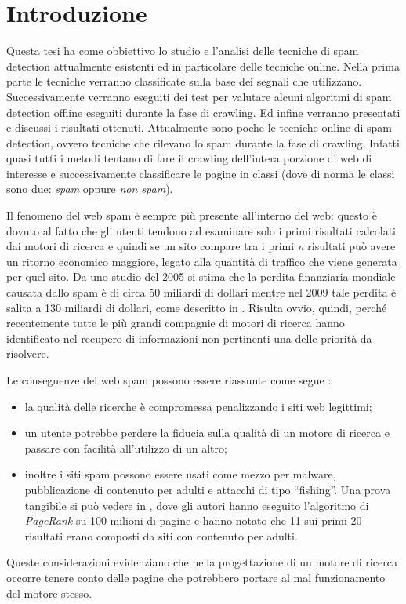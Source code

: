 \chapter{Introduzione}

Questa tesi ha come obbiettivo lo studio e l'analisi delle tecniche di spam detection attualmente esistenti ed in particolare delle tecniche online. Nella prima parte le tecniche verranno classificate sulla base dei segnali che utilizzano. Successivamente verranno eseguiti dei test per valutare alcuni algoritmi di spam detection offline eseguiti durante la fase di crawling. Ed infine verranno presentati e discussi i risultati ottenuti. Attualmente sono poche le tecniche online di spam detection, ovvero tecniche che rilevano lo spam durante la fase di crawling. Infatti quasi tutti i metodi tentano di fare il crawling dell'intera porzione di web di interesse e successivamente classificare le pagine in classi (dove di norma le classi sono due: \textit{spam} oppure \textit{non spam}).

Il fenomeno del web spam è sempre più presente all'interno del web: questo è dovuto al fatto che gli utenti tendono ad esaminare solo i primi risultati calcolati dai motori di ricerca e quindi se un sito compare tra i primi \textit{n} risultati può avere un ritorno economico maggiore, legato alla quantità di traffico che viene generata per quel sito. Da uno studio  del 2005 \cite{Nicholas:2005} si stima che la perdita finanziaria mondiale causata dallo spam è di circa 50 miliardi di dollari mentre nel 2009 tale perdita è salita a 130 miliardi di dollari, come descritto in \cite{Nicholas:2009}. Risulta ovvio, quindi, perché recentemente tutte le più grandi compagnie di motori di ricerca hanno identificato nel recupero di informazioni non pertinenti una delle priorità da risolvere. 

Le conseguenze del web spam possono essere riassunte come segue \cite{Spirin:2012:SWS:2207243.2207252}:
\begin{itemize}
 \item la qualità delle ricerche è compromessa penalizzando i siti web legittimi;
 \item un utente potrebbe perdere la fiducia sulla qualità di un motore di ricerca e passare con facilità all'utilizzo di un altro;
 \item inoltre i siti spam possono essere usati come mezzo per malware, pubblicazione di contenuto per adulti e attacchi di tipo ``fishing''. Una prova tangibile si può vedere in \cite{Eiron:2004:RWF:988672.988714}, dove gli autori hanno eseguito l'algoritmo di \textit{PageRank} su 100 milioni di pagine e hanno notato che 11 sui primi 20 risultati erano composti da siti con contenuto per adulti.
\end{itemize}
Queste considerazioni evidenziano che nella progettazione di un motore di ricerca occorre tenere conto delle pagine che potrebbero portare al mal funzionamento del motore stesso.

